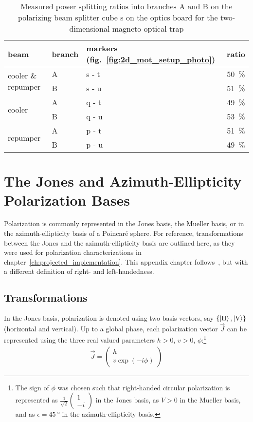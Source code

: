 \begin{table}[h]
    \centering
    \begin{tabular}{lllc}
        \toprule
        \textbf{beam} & \textbf{branch} & \textbf{markers} (fig.~\ref{fig:2d_mot_setup_photo}) & \textbf{ratio} \\
        \toprule
        \multirow{2}{*}{cooler \& repumper} & A & s - t & \SI{50}{\percent} \\
        & B & s - u & \SI{51}{\percent} \\
        \midrule
        \multirow{2}{*}{cooler} & A & q - t & \SI{49}{\percent} \\
        & B & q - u & \SI{53}{\percent} \\
        \midrule
        \multirow{2}{*}{repumper} & A & p - t & \SI{51}{\percent} \\
        & B & p - u & \SI{49}{\percent} \\
        \bottomrule
    \end{tabular}
    \caption{Measured power splitting ratios into branches A and B on the polarizing beam splitter cube s on the optics board for the two-dimensional magneto-optical trap}
    \label{tab:power_splitting}
\end{table}



\chapter{The Jones and Azimuth-Ellipticity Polarization Bases}\label{ch:pypol_trafos}
Polarization is commonly represented in the Jones basis, the Mueller basis, or in the azimuth-ellipticity basis of a Poincaré sphere. For reference, transformations between the Jones and the azimuth-ellipticity basis are outlined here, as they were used for polarization characterizations in chapter~\ref{ch:projected_implementation}. This appendix chapter follows~\cite{trager_springer_2012}, but with a different definition of right- and left-handedness.

\section*{Transformations}
In the Jones basis, polarization is denoted using two basis vectors, say $\{\Ket{\text{H}}, \Ket{\text{V}}\}$ (horizontal and vertical). Up to a global phase, each polarization vector $\vec J$ can be represented using the three real valued parameters $h > 0$, $v > 0$, $\phi$:\footnote[1]{The sign of $\phi$ was chosen such that right-handed circular polarization is represented as $\frac{1}{\sqrt{2}}\begin{pmatrix}1 \\ -i \end{pmatrix}$ in the Jones basis, as $V > 0$ in the Mueller basis, and as $\epsilon  = \SI{45}{\degree}$ in the azimuth-ellipticity basis.}
\begin{align}
    \vec J = \begin{pmatrix}h \\ v \exp(-i \phi)\end{pmatrix}
\end{align}

